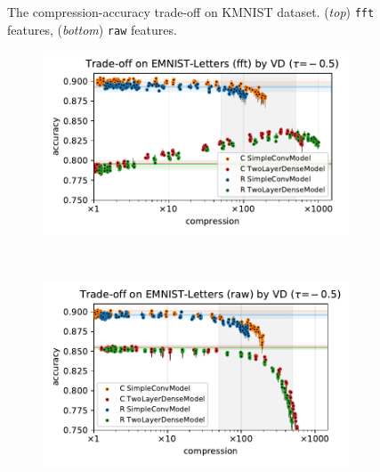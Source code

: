 \documentclass[a4paper,10pt]{article}
\begin{document}
\begin{figure}[!h]
\begin{subfigure}[b]{1.\textwidth}
  \end{subfigure}
  \caption{%
    The compression-accuracy trade-off on KMNIST dataset.
    (\textit{top}) \texttt{fft} features, (\textit{bottom}) \texttt{raw} features.
  }
  \label{fig:mnist-like__trade-off__kmnist}
\end{figure}

\begin{figure}[!h]
  \centering
  \begin{subfigure}[b]{1.\textwidth}  %
    \centering
    \includegraphics[width=\linewidth]{../assets/figure__mnist-like__trade-off/legacy__VD__emnist_letters__fft__-0.5.pdf}
  \end{subfigure} \\%
  \begin{subfigure}[b]{1.\textwidth}  %
    \centering
    \includegraphics[width=\linewidth]{../assets/figure__mnist-like__trade-off/legacy__VD__emnist_letters__raw__-0.5.pdf}

\end{subfigure}
\end{figure}
\end{document}
